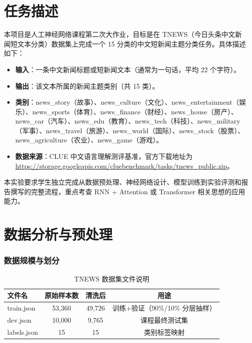 
\chapter{任务描述}

本项目是人工神经网络课程第二次大作业，目标是在 TNEWS（今日头条中文新闻短文本分类）数据集上完成一个 15 分类的中文短新闻主题分类任务\cite{clue}。具体描述如下：

\begin{itemize}
\item \textbf{输入}：一条中文新闻标题或短新闻文本（通常为一句话，平均 22 个字符）。
\item \textbf{输出}：该文本所属的新闻主题类别（共 15 类）。
\item \textbf{类别}：news\_story（故事）、news\_culture（文化）、news\_entertainment（娱乐）、news\_sports（体育）、news\_finance（财经）、news\_house（房产）、news\_car（汽车）、news\_edu（教育）、news\_tech（科技）、news\_military（军事）、news\_travel（旅游）、news\_world（国际）、news\_stock（股票）、news\_agriculture（农业）、news\_game（游戏）。
\item \textbf{数据来源}：CLUE 中文语言理解测评基准\cite{clue}，官方下载地址为 \url{https://storage.googleapis.com/cluebenchmark/tasks/tnews_public.zip}。
\end{itemize}

本实验要求学生独立完成从数据预处理、神经网络设计、模型训练到实验评测和报告撰写的完整流程，重点考查 RNN + Attention 或 Transformer 相关思想的应用能力。

\chapter{数据分析与预处理}

\subsection{数据规模与划分}

\begin{table}[htbp]
\centering
\caption{TNEWS 数据集文件说明}
\begin{tabular}{lccc}
\hline
文件名 & 原始样本数 & 清洗后 & 用途 \\
\hline
train.json & 53,360 & 49,726 & 训练+验证（90\%/10\% 分层抽样） \\
dev.json  & 10,000 & 9,765  & 课程最终测试集 \\
labels.json & 15 & 15 & 类别标签映射 \\
\hline
\end{tabular}
\end{table}

